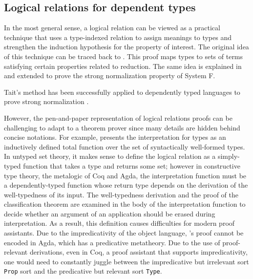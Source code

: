 \documentclass[acmsmall,screen=true,
\ifpublic review=false\else,review=true\fi
  ,anonymous=\ifanonymous true\else false\fi]{acmart}
\newcommand{\scw}[1]{}
\newcommand{\yl}[1]{}
\begin{document}
\subsection{Logical relations for dependent types}
In the most general sense, a logical relation can be viewed as a
practical technique that uses a type-indexed relation to assign
meanings to types and strengthen the induction hypothesis for the
property of interest. The original idea of this technique can be
traced back to
\citet{tait1967:reducibility}. This proof maps
types to sets of terms satisfying certain properties related to reduction.
The same idea is explained in \citet{girard1989proofs} and extended to
prove the strong normalization property of System F.

Tait's method has been successfully applied to dependently typed
languages to prove strong normalization \cite{Martin-Lof-1973,luo1990extended,geuvers1994short, barendregt:lambda-calculi-with-types}.

However, the pen-and-paper representation of logical relations proofs
can be challenging to adapt to a theorem prover since many details
are hidden behind concise notations.
For example, \citet{geuvers1994short} presents the interpretation for types as
an inductively defined total function over the set of syntactically
well-formed types. \scw{The issue is that Geuver's metalogic is (untyped) set
theory, but Coq and Agda use type theory.}
In untyped set theory, it makes sense to define the logical relation as a
simply-typed function that takes a type and returns some set; however
in constructive type theory, the metalogic of Coq and Agda, the
interpretation function must be a dependently-typed function whose
return type depends on the derivation of the well-typedness of its
input. The well-typedness derivation and the proof of the
classification theorem\scw{what is the classification theorem}\yl{It
  says all well-formed terms A (either G |- A : .. or G |- .. : A)
then A is either an object, a type, or a kind. The classification is
used to guide erasure}
are examined in the body
of the interpretation function to decide whether an argument of an
application should be erased during interpretation. As a result, this
definition causes difficulties for modern proof assistants.
Due to the
impredicativity of the object language, \citet{geuvers1994short}'s
proof cannot be encoded in Agda, which has a predicative
metatheory. Due to the use of proof-relevant derivations, even in
Coq, a proof assistant that supports impredicativity, one would need
to constantly juggle between the impredicative but irrelevant sort
\texttt{Prop} sort and the predicative but relevant sort
\texttt{Type}.
\end{document}
